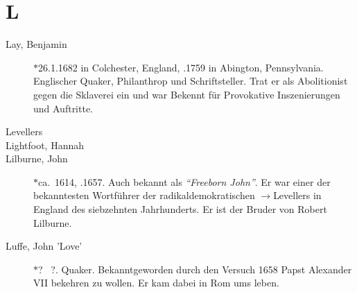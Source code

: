 \section*{L}

\articlesize

\begin{description}

 \item[Lay, Benjamin] $\ast$26.1.1682 in Colchester, England, .1759 in Abington, Pennsylvania. Englischer Quaker, Philanthrop und Schriftsteller. Trat er als Abolitionist gegen die Sklaverei ein und war Bekennt für Provokative Inszenierungen und Auftritte.

 \item[Levellers]

 \item[Lightfoot, Hannah]

 \item[Lilburne, John] $\ast$ca.~1614, .1657. Auch bekannt als \textit{"`Freeborn John"'}. Er war einer der bekanntesten Wortführer der radikaldemokratischen $\to$Levellers in England des siebzehnten Jahrhunderts. Er ist der Bruder von Robert Lilburne.

 \item[Luffe, John 'Love'] $\ast$? \dag~?. Quaker. Bekanntgeworden durch den Versuch 1658 Papst Alexander VII bekehren zu wollen. Er kam dabei in Rom ums leben.

 \end{description}
\normalsize
